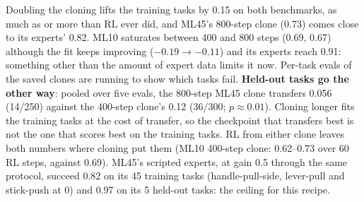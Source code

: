 \documentclass[11pt]{article}
\begin{document}
Doubling the cloning lifts the training tasks by 0.15 on both benchmarks, as much as or more than RL ever did, and ML45's
800-step clone (0.73) comes close to its experts' 0.82. ML10 saturates between 400 and 800 steps (0.69, 0.67) although
the fit keeps improving ($-0.19 \to -0.11$) and its experts reach 0.91: something other than the amount of expert data
limits it now. Per-task evals of the saved clones are running to show which tasks fail. \textbf{Held-out tasks go the other way}: pooled over five evals,
the 800-step ML45 clone transfers 0.056 (14/250) against the 400-step clone's 0.12 (36/300; $p\approx0.01$). Cloning
longer fits the training tasks at the cost of transfer, so the checkpoint that transfers best is not the one that scores
best on the training tasks. RL from either clone leaves both numbers where cloning put them (ML10 400-step clone: 0.62--0.73
over 60 RL steps, against 0.69).
ML45's scripted experts, at gain 0.5 through the same protocol, succeed 0.82 on its 45 training tasks (handle-pull-side,
lever-pull and stick-push at 0) and 0.97 on its 5 held-out tasks: the ceiling for this recipe.
\end{document}
